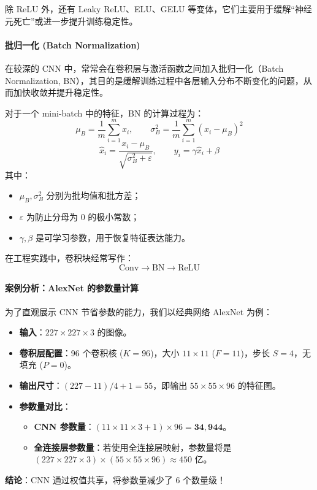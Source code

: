 除 ReLU 外，还有 Leaky ReLU、ELU、GELU 等变体，它们主要用于缓解“神经元死亡”或进一步提升训练稳定性。

\paragraph{批归一化 (Batch Normalization)}

在较深的 CNN 中，常常会在卷积层与激活函数之间加入批归一化（Batch Normalization, BN），其目的是缓解训练过程中各层输入分布不断变化的问题，从而加快收敛并提升稳定性。

对于一个 mini-batch 中的特征，BN 的计算过程为：
\begin{equation}
\mu_B = \frac{1}{m}\sum_{i=1}^{m} x_i,
\qquad
\sigma_B^2 = \frac{1}{m}\sum_{i=1}^{m}(x_i-\mu_B)^2
\end{equation}
\begin{equation}
\hat{x}_i = \frac{x_i-\mu_B}{\sqrt{\sigma_B^2+\varepsilon}},
\qquad
y_i = \gamma \hat{x}_i + \beta
\end{equation}
其中：
\begin{itemize}
    \item $\mu_B,\sigma_B^2$ 分别为批均值和批方差；
    \item $\varepsilon$ 为防止分母为 0 的极小常数；
    \item $\gamma,\beta$ 是可学习参数，用于恢复特征表达能力。
\end{itemize}

在工程实践中，卷积块经常写作：
\[
\text{Conv} \rightarrow \text{BN} \rightarrow \text{ReLU}
\]

\paragraph{案例分析：AlexNet 的参数量计算}
为了直观展示 CNN 节省参数的能力，我们以经典网络 AlexNet 为例：
\begin{itemize}
    \item \textbf{输入}：$227 \times 227 \times 3$ 的图像。
    \item \textbf{卷积层配置}：96 个卷积核 ($K=96$)，大小 $11 \times 11$ ($F=11$)，步长 $S=4$，无填充 ($P=0$)。
    \item \textbf{输出尺寸}：$(227 - 11)/4 + 1 = 55$，即输出 $55 \times 55 \times 96$ 的特征图。
    \item \textbf{参数量对比}：
    \begin{itemize}
        \item \textbf{CNN 参数量}：$(11 \times 11 \times 3 + 1) \times 96 = \mathbf{34,944}$。
        \item \textbf{全连接层参数量}：若使用全连接层映射，参数量将是 $(227 \times 227 \times 3) \times (55 \times 55 \times 96) \approx 450$ 亿。
    \end{itemize}
\end{itemize}
\textbf{结论}：CNN 通过权值共享，将参数量减少了 6 个数量级！

